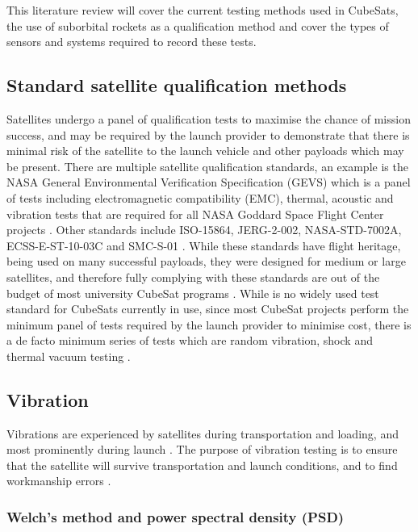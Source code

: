 \documentclass[a4paper,11pt]{article}
\begin{document}
This literature review will cover the current testing methods used in CubeSats, the use of suborbital rockets as a qualification method and cover the types of sensors and systems required to record these tests.

\subsection{Standard satellite qualification methods}
Satellites undergo a panel of qualification tests to maximise the chance of mission success, and may be required by the launch provider to demonstrate that there is minimal risk of the satellite to the launch vehicle and other payloads which may be present. There are multiple satellite qualification standards, an example is the NASA General Environmental Verification Specification (GEVS) which is a panel of tests including electromagnetic compatibility (EMC), thermal, acoustic and vibration tests that are required for all NASA Goddard Space Flight Center projects \cite{nasa-gevs}. Other standards include ISO-15864, JERG-2-002, NASA-STD-7002A, ECSS-E-ST-10-03C and SMC-S-01 \cite{cho2012overview}. While these standards have flight heritage, being used on many successful payloads, they were designed for medium or large satellites, and therefore fully complying with these standards are out of the budget of most university CubeSat programs \cite{cho2012overview}. While is no widely used test standard for CubeSats currently in use, since most CubeSat projects perform the minimum panel of tests required by the launch provider to minimise cost, there is a de facto minimum series of tests which are random vibration, shock and thermal vacuum testing \cite{welle2020overview}.


\subsection{Vibration}
Vibrations are experienced by satellites during transportation and loading, and most prominently during launch \cite{brown_elements_2002}. The purpose of vibration testing is to ensure that the satellite will survive transportation and launch conditions, and to find workmanship errors \cite{brown_elements_2002,gordon2015benefits}.

\subsubsection{Welch's method and power spectral density (PSD)}
\end{document}
